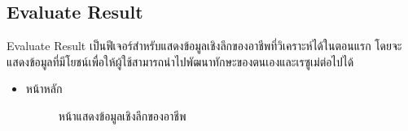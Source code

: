 \subsection {Evaluate Result}
Evaluate Result เป็นฟีเจอร์สำหรับแสดงข้อมูลเชิงลึกของอาชีพที่วิเคราะห์ได้ในตอนแรก โดยจะแสดงข้อมูลที่มีโยชน์เพื่อให้ผู้ใช้สามารถนำไปพัฒนาทักษะของตนเองและเรซูเม่ต่อไปได้
\begin{itemize}
    \item หน้าหลัก
    \begin{figure}[H]\centering
    \setlength{\fboxrule}{0.2mm} %
    \setlength{\fboxsep}{0.5cm}
  \caption{\centering หน้าแสดงข้อมูลเชิงลึกของอาชีพ}\label{fig:wireframe3_1}
\end{figure}
\end{itemize}

